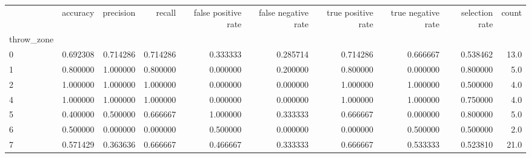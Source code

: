 \begin{tabular}{lrrrrrrrrr}
\toprule
{} &  accuracy &  precision &    recall &  false positive rate &  false negative rate &  true positive rate &  true negative rate &  selection rate &  count \\
throw\_zone &           &            &           &                      &                      &                     &                     &                 &        \\
\midrule
0          &  0.692308 &   0.714286 &  0.714286 &             0.333333 &             0.285714 &            0.714286 &            0.666667 &        0.538462 &   13.0 \\
1          &  0.800000 &   1.000000 &  0.800000 &             0.000000 &             0.200000 &            0.800000 &            0.000000 &        0.800000 &    5.0 \\
2          &  1.000000 &   1.000000 &  1.000000 &             0.000000 &             0.000000 &            1.000000 &            1.000000 &        0.500000 &    4.0 \\
4          &  1.000000 &   1.000000 &  1.000000 &             0.000000 &             0.000000 &            1.000000 &            1.000000 &        0.750000 &    4.0 \\
5          &  0.400000 &   0.500000 &  0.666667 &             1.000000 &             0.333333 &            0.666667 &            0.000000 &        0.800000 &    5.0 \\
6          &  0.500000 &   0.000000 &  0.000000 &             0.500000 &             0.000000 &            0.000000 &            0.500000 &        0.500000 &    2.0 \\
7          &  0.571429 &   0.363636 &  0.666667 &             0.466667 &             0.333333 &            0.666667 &            0.533333 &        0.523810 &   21.0 \\
\bottomrule
\end{tabular}
